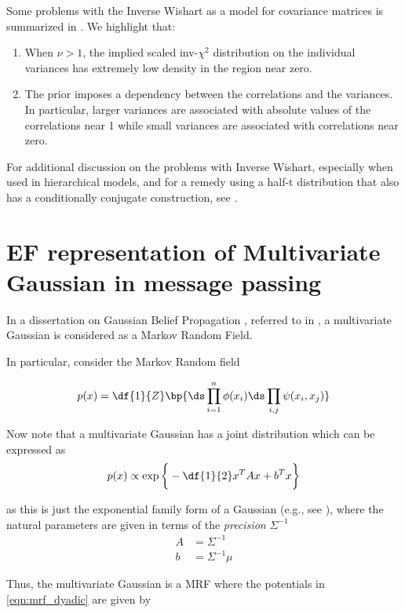 \documentclass{article} %
\newcommand{\selfpotential}{\phi}
\newcommand{\edgepotential}{\psi}
\begin{document}
Some problems with the Inverse Wishart as a model for covariance matrices is summarized in  \cite{alvarez2014bayesian}.    We highlight that:
\begin{enumerate}
\item  When $\nu  > 1$,   the implied scaled inv-$\chi^2$ distribution on the individual variances has extremely low density in the region near zero.   
\item The prior imposes a dependency between the correlations and the variances. In particular,  larger variances are associated with absolute values of the correlations near 1 while small variances
are associated with correlations near zero.    
\end{enumerate}
For additional discussion on the problems with Inverse Wishart,  especially when used in hierarchical models,  and for a remedy using a half-t distribution that also has a conditionally conjugate construction,  see \cite{wojnowiczXXXXcategorical}.


 \section{EF representation of Multivariate Gaussian in message passing}
 \label{sec:mvn_in_message_passing}
 
In a dissertation on Gaussian Belief Propagation \cite{bickson2008gaussian}, referred to in \cite{krishnan2016structured}, a multivariate Gaussian is considered as a Markov Random Field. 

In particular, consider the Markov Random field

\begin{equation}
p(x) = \df{1}{Z}\bp{ \ds\prod_{i=1}^n \selfpotential(x_i) \ds\prod_{i,j} \edgepotential(x_i, x_j)  } 
\label{eqn:mrf_dyadic}
\end{equation}

Now note that a multivariate Gaussian has a joint distribution which can be expressed as
\[ p(x) \propto \exp \bigg\{ -\df{1}{2} x^T A x + b^T x \bigg\} \]

as this is just the exponential family form of a Gaussian (e.g., see  \cite{englehardt_gaussian_models}), where the natural parameters are
given in terms of the \textit{precision} $\Sigma^{-1}$
\begin{align*}
A &= \Sigma^{-1} \\
b &= \Sigma^{-1} \mu
\end{align*}

Thus, the multivariate Gaussian is a MRF where the potentials in \eqref{eqn:mrf_dyadic} are given by
\end{document}
